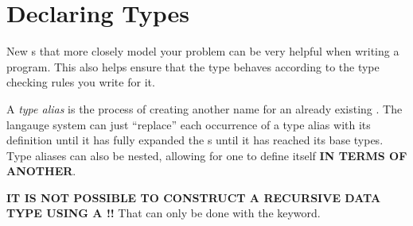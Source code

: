 \section{Declaring Types}\label{sec:Declaring_Types}
New s that more closely model your problem can be very helpful when writing a program.
This also helps ensure that the type behaves according to the type checking rules you write for it.

\begin{definition}\label{def:Type_Alias}
  A \emph{type alias} is the process of creating another name for an already existing .
  The langauge system can just ``replace'' each occurrence of a type alias with its definition until it has fully expanded the s until it has reached its base types.
  Type aliases can also be nested, allowing for one to define itself \textbf{IN TERMS OF ANOTHER}.

  \begin{remark}\label{rmk:Recursive_Type_Alias}
    \textbf{IT IS NOT POSSIBLE TO CONSTRUCT A RECURSIVE DATA TYPE USING A !!}
    That can only be done with the  keyword.
  \end{remark}
\end{definition}


